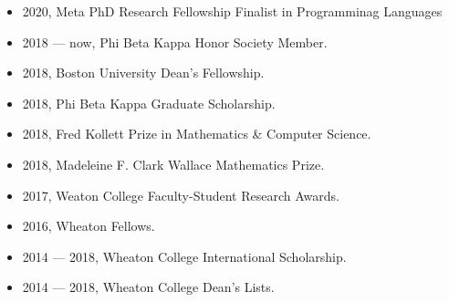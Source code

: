 \begin{itemize}
    \item 2020, Meta PhD Research Fellowship Finalist in Programminag Languages
    \item 2018 --- now, Phi Beta Kappa Honor Society Member.
    \item 2018, Boston University Dean's Fellowship.
    \item 2018, Phi Beta Kappa Graduate Scholarship.
    \item 2018, Fred Kollett Prize in Mathematics \& Computer Science.
    \item 2018, Madeleine F. Clark Wallace Mathematics Prize.
    \item 2017, Weaton College Faculty-Student Research Awards.
    \item 2016, Wheaton Fellows.
    \item 2014 --- 2018, Wheaton College International Scholarship.
    \item 2014 --- 2018, Wheaton College Dean's Lists.
\end{itemize}







